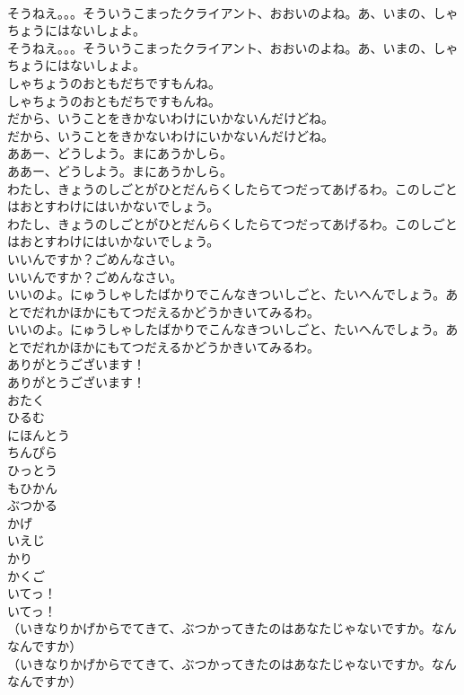 \documentclass[8pt]{extreport}
\begin{document}
\begin{CJK}{UTF8}{min}
\\	そうねえ。。。そういうこまったクライアント、おおいのよね。あ、いまの、しゃちょうにはないしょよ。
\\	そうねえ。。。そういうこまったクライアント、おおいのよね。あ、いまの、しゃちょうにはないしょよ。
\\	しゃちょうのおともだちですもんね。
\\	しゃちょうのおともだちですもんね。
\\	だから、いうことをきかないわけにいかないんだけどね。
\\	だから、いうことをきかないわけにいかないんだけどね。
\\	ああー、どうしよう。まにあうかしら。
\\	ああー、どうしよう。まにあうかしら。
\\	わたし、きょうのしごとがひとだんらくしたらてつだってあげるわ。このしごとはおとすわけにはいかないでしょう。
\\	わたし、きょうのしごとがひとだんらくしたらてつだってあげるわ。このしごとはおとすわけにはいかないでしょう。
\\	いいんですか？ごめんなさい。
\\	いいんですか？ごめんなさい。
\\	いいのよ。にゅうしゃしたばかりでこんなきついしごと、たいへんでしょう。あとでだれかほかにもてつだえるかどうかきいてみるわ。
\\	いいのよ。にゅうしゃしたばかりでこんなきついしごと、たいへんでしょう。あとでだれかほかにもてつだえるかどうかきいてみるわ。
\\	ありがとうございます！
\\	ありがとうございます！
\\	おたく
\\	ひるむ
\\	にほんとう
\\	ちんぴら
\\	ひっとう
\\	もひかん
\\	ぶつかる
\\	かげ
\\	いえじ
\\	かり
\\	かくご
\\	いてっ！
\\	いてっ！
\\	（いきなりかげからでてきて、ぶつかってきたのはあなたじゃないですか。なんなんですか）
\\	（いきなりかげからでてきて、ぶつかってきたのはあなたじゃないですか。なんなんですか）

\end{CJK}
\end{document}
